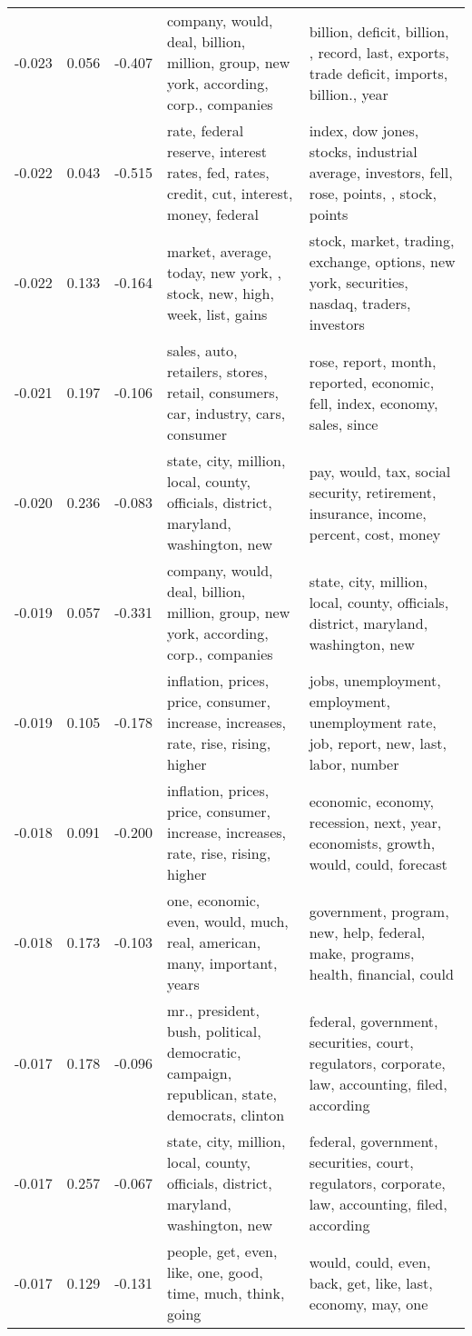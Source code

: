 \begin{tabular}{cccp{5cm}p{5cm}}
-0.023 & 0.056 & -0.407 & company, would, deal, billion, million, group, new york, according, corp., companies & billion, deficit, billion, , record, last, exports, trade deficit, imports, billion., year \\
-0.022 & 0.043 & -0.515 & rate, federal reserve, interest rates, fed, rates, credit, cut, interest, money, federal & index, dow jones, stocks, industrial average, investors, fell, rose, points, , stock, points \\
-0.022 & 0.133 & -0.164 & market, average, today, new york, , stock, new, high, week, list, gains & stock, market, trading, exchange, options, new york, securities, nasdaq, traders, investors \\
-0.021 & 0.197 & -0.106 & sales, auto, retailers, stores, retail, consumers, car, industry, cars, consumer & rose, report, month, reported, economic, fell, index, economy, sales, since \\
-0.020 & 0.236 & -0.083 & state, city, million, local, county, officials, district, maryland, washington, new & pay, would, tax, social security, retirement, insurance, income, percent, cost, money \\
-0.019 & 0.057 & -0.331 & company, would, deal, billion, million, group, new york, according, corp., companies & state, city, million, local, county, officials, district, maryland, washington, new \\
-0.019 & 0.105 & -0.178 & inflation, prices, price, consumer, increase, increases, rate, rise, rising, higher & jobs, unemployment, employment, unemployment rate, job, report, new, last, labor, number \\
-0.018 & 0.091 & -0.200 & inflation, prices, price, consumer, increase, increases, rate, rise, rising, higher & economic, economy, recession, next, year, economists, growth, would, could, forecast \\
-0.018 & 0.173 & -0.103 & one, economic, even, would, much, real, american, many, important, years & government, program, new, help, federal, make, programs, health, financial, could \\
-0.017 & 0.178 & -0.096 & mr., president, bush, political, democratic, campaign, republican, state, democrats, clinton & federal, government, securities, court, regulators, corporate, law, accounting, filed, according \\
-0.017 & 0.257 & -0.067 & state, city, million, local, county, officials, district, maryland, washington, new & federal, government, securities, court, regulators, corporate, law, accounting, filed, according \\
-0.017 & 0.129 & -0.131 & people, get, even, like, one, good, time, much, think, going & would, could, even, back, get, like, last, economy, may, one \\
\bottomrule
\end{tabular}
